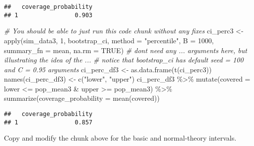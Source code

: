 \documentclass[
]{article}
\newenvironment{Shaded}{\begin{snugshade}}{\end{snugshade}}
\newcommand{\AttributeTok}[1]{\textcolor[rgb]{0.77,0.63,0.00}{#1}}
\newcommand{\CommentTok}[1]{\textcolor[rgb]{0.56,0.35,0.01}{\textit{#1}}}
\newcommand{\ConstantTok}[1]{\textcolor[rgb]{0.00,0.00,0.00}{#1}}
\newcommand{\DecValTok}[1]{\textcolor[rgb]{0.00,0.00,0.81}{#1}}
\newcommand{\FunctionTok}[1]{\textcolor[rgb]{0.00,0.00,0.00}{#1}}
\newcommand{\NormalTok}[1]{#1}
\newcommand{\OtherTok}[1]{\textcolor[rgb]{0.56,0.35,0.01}{#1}}
\newcommand{\SpecialCharTok}[1]{\textcolor[rgb]{0.00,0.00,0.00}{#1}}
\newcommand{\StringTok}[1]{\textcolor[rgb]{0.31,0.60,0.02}{#1}}
\begin{document}
\begin{verbatim}
##   coverage_probability
## 1                0.903
\end{verbatim}

\begin{Shaded}
\begin{Highlighting}[]
\CommentTok{\# You should be able to just run this code chunk without any fixes}
\NormalTok{ci\_perc3 }\OtherTok{\textless{}{-}} \FunctionTok{apply}\NormalTok{(sim\_data3, }\DecValTok{1}\NormalTok{, bootstrap\_ci, }\AttributeTok{method =} \StringTok{"percentile"}\NormalTok{, }\AttributeTok{B =} \DecValTok{1000}\NormalTok{, }\AttributeTok{summary\_fn =}\NormalTok{ mean, }\AttributeTok{na.rm =} \ConstantTok{TRUE}\NormalTok{)}
\CommentTok{\# don\textquotesingle{}t need any ... arguments here, but illustrating the idea of the ...}
\CommentTok{\# notice that bootstrap\_ci has default seed = 100 and C = 0.95 arguments}
\NormalTok{ci\_perc\_df3 }\OtherTok{\textless{}{-}} \FunctionTok{as.data.frame}\NormalTok{(}\FunctionTok{t}\NormalTok{(ci\_perc3))}
\FunctionTok{names}\NormalTok{(ci\_perc\_df3) }\OtherTok{\textless{}{-}} \FunctionTok{c}\NormalTok{(}\StringTok{"lower"}\NormalTok{, }\StringTok{"upper"}\NormalTok{)}
\NormalTok{ci\_perc\_df3 }\SpecialCharTok{\%\textgreater{}\%} \FunctionTok{mutate}\NormalTok{(}\AttributeTok{covered =}\NormalTok{ lower }\SpecialCharTok{\textless{}=}\NormalTok{ pop\_mean3 }\SpecialCharTok{\&}\NormalTok{ upper }\SpecialCharTok{\textgreater{}=}\NormalTok{ pop\_mean3) }\SpecialCharTok{\%\textgreater{}\%}
  \FunctionTok{summarize}\NormalTok{(}\AttributeTok{coverage\_probability =} \FunctionTok{mean}\NormalTok{(covered))}
\end{Highlighting}
\end{Shaded}

\begin{verbatim}
##   coverage_probability
## 1                0.857
\end{verbatim}

Copy and modify the chunk above for the basic and normal-theory
intervals.
\end{document}
